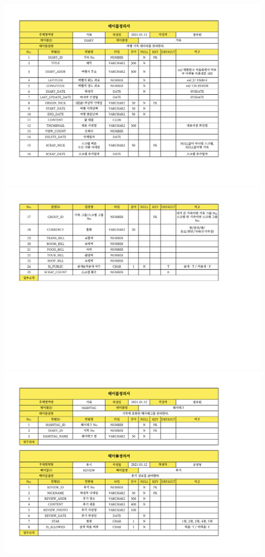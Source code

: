 \begin{landscape}
    {\includegraphics[width=30cm]{./Figure/Design/Display/table/table_04.pdf}} \\
    {\includegraphics[width=30cm]{./Figure/Design/Display/table/table_05.pdf}} \\
    {\includegraphics[width=30cm]{./Figure/Design/Display/table/table_06.pdf}} \\

\end{landscape}
